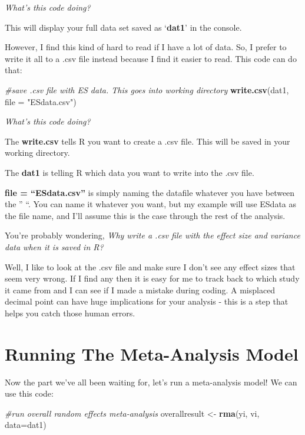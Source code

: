 \documentclass[
]{book}
\newenvironment{Shaded}{\begin{snugshade}}{\end{snugshade}}
\newcommand{\AttributeTok}[1]{\textcolor[rgb]{0.13,0.29,0.53}{#1}}
\newcommand{\CommentTok}[1]{\textcolor[rgb]{0.56,0.35,0.01}{\textit{#1}}}
\newcommand{\FunctionTok}[1]{\textcolor[rgb]{0.13,0.29,0.53}{\textbf{#1}}}
\newcommand{\NormalTok}[1]{#1}
\newcommand{\OtherTok}[1]{\textcolor[rgb]{0.56,0.35,0.01}{#1}}
\newcommand{\StringTok}[1]{\textcolor[rgb]{0.31,0.60,0.02}{#1}}
\begin{document}
\emph{What's this code doing?}

This will display your full data set saved as `\textbf{dat1}' in the console.

However, I find this kind of hard to read if I have a lot of data. So, I prefer to write it all to a .csv file instead because I find it easier to read. This code can do that:

\begin{Shaded}
\begin{Highlighting}[]
\CommentTok{\#save .csv file with ES data. This goes into working directory}
\FunctionTok{write.csv}\NormalTok{(dat1, }\AttributeTok{file =} \StringTok{"ESdata.csv"}\NormalTok{)}
\end{Highlighting}
\end{Shaded}

\emph{What's this code doing?}

The \textbf{write.csv} tells R you want to create a .csv file. This will be saved in your working directory.

The \textbf{dat1} is telling R which data you want to write into the .csv file.

\textbf{file = ``ESdata.csv''} is simply naming the datafile whatever you have between the '' ``. You can name it whatever you want, but my example will use ESdata as the file name, and I'll assume this is the case through the rest of the analysis.

You're probably wondering, \emph{Why write a .csv file with the effect size and variance data when it is saved in R?}

Well, I like to look at the .csv file and make sure I don't see any effect sizes that seem very wrong. If I find any then it is easy for me to track back to which study it came from and I can see if I made a mistake during coding. A misplaced decimal point can have huge implications for your analysis - this is a step that helps you catch those human errors.

\hypertarget{running-the-meta-analysis-model}{%
\section{Running The Meta-Analysis Model}\label{running-the-meta-analysis-model}}

Now the part we've all been waiting for, let's run a meta-analysis model! We can use this code:

\begin{Shaded}
\begin{Highlighting}[]
\CommentTok{\#run overall random effects meta{-}analysis}
\NormalTok{overallresult }\OtherTok{\textless{}{-}} \FunctionTok{rma}\NormalTok{(yi, vi, }\AttributeTok{data=}\NormalTok{dat1)}
\end{Highlighting}
\end{Shaded}
\end{document}
